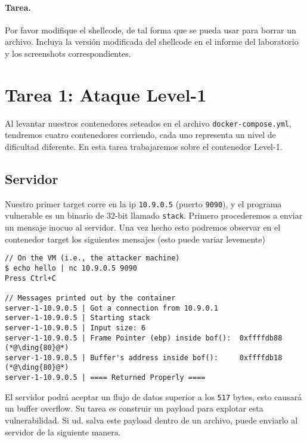 \paragraph{Tarea.} Por favor modifique el shellcode, de tal forma que se pueda usar para borrar un archivo. Incluya la versión modificada del shellcode en el informe del laboratorio y los screenshots correspondientes.



\section{Tarea 1: Ataque Level-1} 

Al levantar nuestros contenedores seteados en el archivo \texttt{docker-compose.yml}, tendremos cuatro contenedores corriendo, cada uno representa un nivel de dificultad diferente.
En esta tarea trabajaremos sobre el contenedor Level-1.


\subsection{Servidor} 

Nuestro primer target corre en la ip \texttt{10.9.0.5} (puerto \texttt{9090}), y el programa vulnerable es un binario de 32-bit llamado \texttt{stack}.
Primero procederemos a enviar un mensaje inocuo al servidor.
Una vez hecho esto podremos observar en el contenedor target los siguientes mensajes (esto puede variar levemente)

\begin{lstlisting}
// On the VM (i.e., the attacker machine)
$ echo hello | nc 10.9.0.5 9090
Press Ctrl+C

// Messages printed out by the container
server-1-10.9.0.5 | Got a connection from 10.9.0.1
server-1-10.9.0.5 | Starting stack
server-1-10.9.0.5 | Input size: 6
server-1-10.9.0.5 | Frame Pointer (ebp) inside bof():  0xffffdb88    (*@\ding{80}@*)
server-1-10.9.0.5 | Buffer's address inside bof():     0xffffdb18    (*@\ding{80}@*)
server-1-10.9.0.5 | ==== Returned Properly ====
\end{lstlisting}

El servidor podrá aceptar un flujo de datos superior a los \texttt{517} bytes, esto causará un buffer overflow. Su tarea es construir un payload para explotar esta vulnerabilidad. Si ud. salva este payload dentro de un archivo, puede enviarlo al servidor de la siguiente manera.


